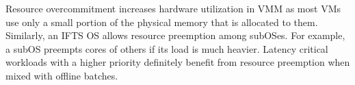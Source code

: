 \documentclass[pageno]{jpaper}
\begin{document}
Resource overcommitment increases hardware utilization in VMM as most VMs use only a small portion of the physical memory that is allocated to them. Similarly, an IFTS OS allows resource preemption among subOSes. For example, a subOS preempts cores of others if its load is much heavier. Latency critical workloads with a higher priority definitely  benefit from resource preemption when mixed with offline batches.
\end{document}
